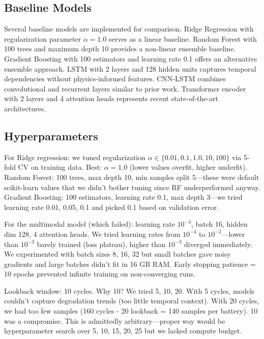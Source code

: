 \documentclass{sn-jnl}
\begin{document}
\subsection{Baseline Models}
\label{subsec:baselines}

Several baseline models are implemented for comparison. Ridge Regression with regularization parameter $\alpha=1.0$ serves as a linear baseline. Random Forest with 100 trees and maximum depth 10 provides a non-linear ensemble baseline. Gradient Boosting with 100 estimators and learning rate 0.1 offers an alternative ensemble approach. LSTM with 2 layers and 128 hidden units captures temporal dependencies without physics-informed features. CNN-LSTM combines convolutional and recurrent layers similar to prior work. Transformer encoder with 2 layers and 4 attention heads represents recent state-of-the-art architectures.

\subsection{Hyperparameters}
\label{subsec:hyperparams}

For Ridge regression: we tuned regularization $\alpha \in \{0.01, 0.1, 1.0, 10, 100\}$ via 5-fold CV on training data. Best: $\alpha = 1.0$ (lower values overfit, higher underfit). Random Forest: 100 trees, max depth 10, min samples split 5—these were default scikit-learn values that we didn't bother tuning since RF underperformed anyway. Gradient Boosting: 100 estimators, learning rate 0.1, max depth 3—we tried learning rate {0.01, 0.05, 0.1} and picked 0.1 based on validation error.

For the multimodal model (which failed): learning rate $10^{-3}$, batch 16, hidden dim 128, 4 attention heads. We tried learning rates from $10^{-4}$ to $10^{-2}$—lower than $10^{-3}$ barely trained (loss plateau), higher than $10^{-3}$ diverged immediately. We experimented with batch sizes {8, 16, 32} but small batches gave noisy gradients and large batches didn't fit in 16 GB RAM. Early stopping patience = 10 epochs prevented infinite training on non-converging runs.

Lookback window: 10 cycles. Why 10? We tried {5, 10, 20}. With 5 cycles, models couldn't capture degradation trends (too little temporal context). With 20 cycles, we had too few samples (160 cycles - 20 lookback = 140 samples per battery). 10 was a compromise. This is admittedly arbitrary—proper way would be hyperparameter search over {5, 10, 15, 20, 25} but we lacked compute budget.
\end{document}
